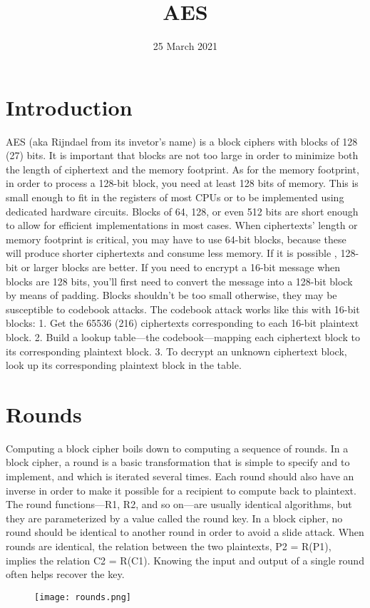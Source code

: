 \documentclass{article}
\title{AES}
\author{}
\date{25 March 2021}
\begin{document}
\maketitle
\section*{Introduction}
AES (aka Rijndael from its invetor's name) is a block ciphers  with blocks of 128 (27) bits. It is important that blocks are not too large in order to minimize both the length of ciphertext and the memory footprint.
As for the memory footprint, in order to process a 128-bit block, you need at least 128 bits of memory. This is small enough to fit in the registers of most CPUs or to be implemented using dedicated hardware circuits. Blocks of 64, 128, or even 512 bits are short enough to allow for efficient implementations in most cases.
When ciphertexts’ length or memory footprint is critical, you may have to use 64-bit blocks, because these will produce shorter ciphertexts and consume less memory. If it is possible , 128-bit or larger blocks are better. If you need to encrypt a 16-bit message when blocks are 128 bits, you’ll first need to convert the message into a 128-bit block by means of padding. Blocks shouldn’t be too small otherwise, they may be susceptible to codebook attacks. The codebook attack works like this with 16-bit blocks:
1. Get the 65536 (216) ciphertexts corresponding to each 16-bit
plaintext block.
2. Build a lookup table—the codebook—mapping each ciphertext block
to its corresponding plaintext block.
3. To decrypt an unknown ciphertext block, look up its corresponding
plaintext block in the table.
\section*{Rounds}
Computing a block cipher boils down to computing a sequence of rounds.
In a block cipher, a round is a basic transformation that is simple to specify and to implement, and which is iterated several times. Each round should also have an inverse in order to make it possible for a recipient to compute back to plaintext. The round functions—R1, R2, and so on—are usually identical algorithms, but they are parameterized by a value called the round key.
In a block cipher, no round should be identical to another round in order to avoid a slide attack. When rounds are identical, the relation between the two plaintexts, P2 = R(P1), implies the relation C2 = R(C1). Knowing the input and output of a single round often helps recover the key.
\begin{figure}[htb]
	\begin{center}
  		\texttt{[image: rounds.png]} 
 	\end{center}
\end{figure}
\end{document}
